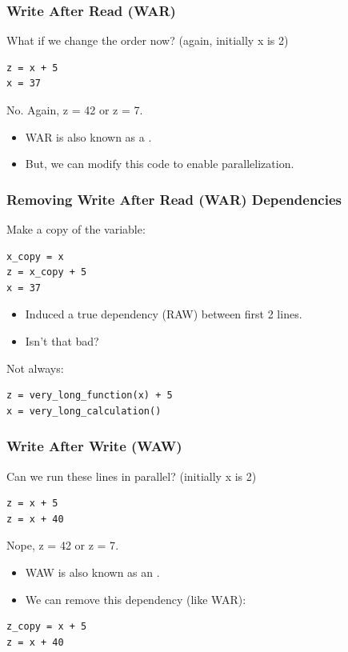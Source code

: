 \begin{frame}[fragile]
\frametitle{Write After Read (WAR)}

What if we change the order now? (again, initially x is 2)
\begin{lstlisting}
z = x + 5
x = 37
\end{lstlisting}
\pause
\alert{No. Again, z = 42 or z = 7.}\\[1em]
\begin{itemize}
\item WAR is also known as a .
\item But, we can modify this code to enable parallelization.
\end{itemize}

\end{frame}

\begin{frame}[fragile]
\frametitle{Removing Write After Read (WAR) Dependencies}

Make a copy of the variable:
\begin{lstlisting}
x_copy = x
z = x_copy + 5
x = 37
\end{lstlisting}
\pause
{}
\begin{itemize}
\item Induced a true dependency (RAW) between first 2 lines.
\item Isn't that bad?
\end{itemize}
\pause
Not always:
\begin{lstlisting}
z = very_long_function(x) + 5
x = very_long_calculation()
\end{lstlisting}

\end{frame}

\begin{frame}[fragile]
\frametitle{Write After Write (WAW)}

Can we run these lines in parallel? (initially x is 2)
\begin{lstlisting}
z = x + 5
z = x + 40
\end{lstlisting}
\pause
\alert{Nope, z = 42 or z = 7}.\\[1em]
\begin{itemize}
\item WAW is also known as an .
\item We can remove this dependency (like WAR):
\end{itemize}
\pause
\begin{lstlisting}
z_copy = x + 5
z = x + 40
\end{lstlisting}

\end{frame}


